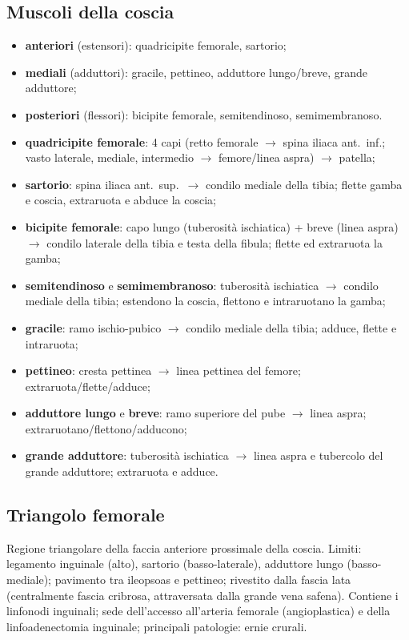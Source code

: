 \subsection{Muscoli della coscia}
\begin{itemize}
  \item \textbf{anteriori} (estensori): quadricipite femorale, sartorio;
  \item \textbf{mediali} (adduttori): gracile, pettineo, adduttore lungo/breve, grande adduttore;
  \item \textbf{posteriori} (flessori): bicipite femorale, semitendinoso, semimembranoso.
\end{itemize}
\begin{itemize}
  \item \textbf{quadricipite femorale}: 4 capi (retto femorale $\rightarrow$ spina iliaca ant.\ inf.;
    vasto laterale, mediale, intermedio $\rightarrow$ femore/linea aspra) $\rightarrow$ patella;
  \item \textbf{sartorio}: spina iliaca ant.\ sup.\ $\rightarrow$ condilo mediale della tibia; flette
    gamba e coscia, extraruota e abduce la coscia;
  \item \textbf{bicipite femorale}: capo lungo (tuberosità ischiatica) + breve (linea aspra)
    $\rightarrow$ condilo laterale della tibia e testa della fibula; flette ed extraruota la gamba;
  \item \textbf{semitendinoso} e \textbf{semimembranoso}: tuberosità ischiatica $\rightarrow$ condilo
    mediale della tibia; estendono la coscia, flettono e intraruotano la gamba;
  \item \textbf{gracile}: ramo ischio-pubico $\rightarrow$ condilo mediale della tibia; adduce,
    flette e intraruota;
  \item \textbf{pettineo}: cresta pettinea $\rightarrow$ linea pettinea del femore;
    extraruota/flette/adduce;
  \item \textbf{adduttore lungo} e \textbf{breve}: ramo superiore del pube $\rightarrow$ linea aspra;
    extraruotano/flettono/adducono;
  \item \textbf{grande adduttore}: tuberosità ischiatica $\rightarrow$ linea aspra e tubercolo del
    grande adduttore; extraruota e adduce.
\end{itemize}

\subsection{Triangolo femorale}
Regione triangolare della faccia anteriore prossimale della coscia. Limiti: legamento inguinale
(alto), sartorio (basso-laterale), adduttore lungo (basso-mediale); pavimento tra ileopsoas e
pettineo; rivestito dalla fascia lata (centralmente fascia cribrosa, attraversata dalla grande vena
safena). Contiene i linfonodi inguinali; sede dell'accesso all'arteria femorale (angioplastica) e
della linfoadenectomia inguinale; principali patologie: ernie crurali.

